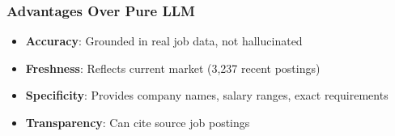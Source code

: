\subsubsection{Advantages Over Pure LLM}

\begin{itemize}
\item \textbf{Accuracy}: Grounded in real job data, not hallucinated
\item \textbf{Freshness}: Reflects current market (3,237 recent postings)
\item \textbf{Specificity}: Provides company names, salary ranges, exact requirements
\item \textbf{Transparency}: Can cite source job postings
\end{itemize}


